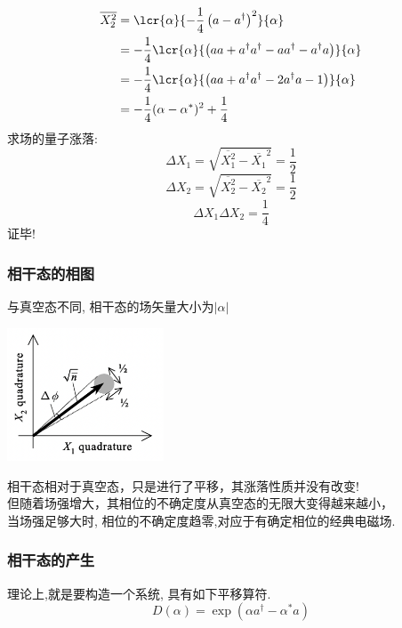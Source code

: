 \begin{frame}
      \frametitle{}
      \[
        \begin{aligned}
          \overline{X^2 _2} &= \lcr{\alpha}{-\frac{1}{4}\left(a-a^{\dagger}\right)^2} {\alpha}  \\ 
          &= -\frac{1}{4}\lcr{\alpha}{\left(aa+a^{\dagger}a^{\dagger}- aa^{\dagger} - a^{\dagger}a\right)} {\alpha}  \\
          &= -\frac{1}{4}\lcr{\alpha}{\left(aa+a^{\dagger}a^{\dagger}- 2a^{\dagger}a - 1 \right)} {\alpha} \\
          &= -\frac{1}{4}(\alpha - \alpha^*)^2 + \frac{1}{4}
        \end{aligned}   
        \]  
        求场的量子涨落:
        \[ \Delta X_1 = \sqrt{\overline{X^2 _1}- \overline{X_1}^2} = \frac{1}{2}\]
        \[ \Delta X_2 = \sqrt{\overline{X^2 _2}- \overline{X_2}^2} = \frac{1}{2}\]
        \[ \Delta X_1 \Delta X_2=\frac{1}{4}\]
    证毕!
\end{frame}

\begin{frame}
      \frametitle{相干态的相图}
    与真空态不同, 相干态的场矢量大小为$\left|\alpha\right|$ 
   \begin{center}
        \includegraphics[width=0.35\textwidth]{figs/13.png}
   \end{center}
   相干态相对于真空态，只是进行了平移，其涨落性质并没有改变!\\ 
   但随着场强增大，其相位的不确定度从真空态的无限大变得越来越小，\\ 当场强足够大时, 相位的不确定度趋零,对应于有确定相位的经典电磁场.
\end{frame}

\begin{frame}
    \frametitle{相干态的产生}
  理论上,就是要构造一个系统, 具有如下平移算符. 
  \[ D(\alpha)=\exp \left(\alpha a^{\dagger}-\alpha^{*} a\right) \] 
\end{frame}

